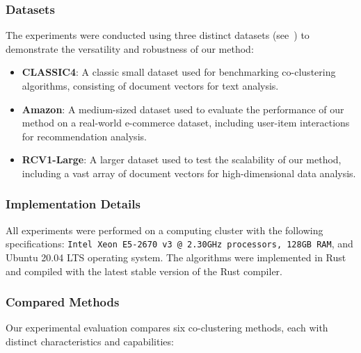 \documentclass[journal]{IEEEtran}
\begin{document}
\subsubsection{Datasets}
The experiments were conducted using three distinct datasets (see~) to demonstrate the versatility and robustness of our method:
\begin{itemize}
    \item \textbf{CLASSIC4}: A classic small dataset used for benchmarking co-clustering algorithms, consisting of document vectors for text analysis.
    \item \textbf{Amazon}: A medium-sized dataset used to evaluate the performance of our method on a real-world e-commerce dataset, including user-item interactions for recommendation analysis.
    \item \textbf{RCV1-Large}: A larger dataset used to test the scalability of our method, including a vast array of document vectors for high-dimensional data analysis.
\end{itemize}

\subsubsection{Implementation Details}
All experiments were performed on a computing cluster with the following specifications: \texttt{Intel Xeon E5-2670 v3 @ 2.30GHz processors, 128GB RAM}, and Ubuntu 20.04 LTS operating system. The algorithms were implemented in Rust and compiled with the latest stable version of the Rust compiler.

\subsubsection{Compared Methods}
Our experimental evaluation compares six co-clustering methods, each with distinct characteristics and capabilities:
\end{document}
